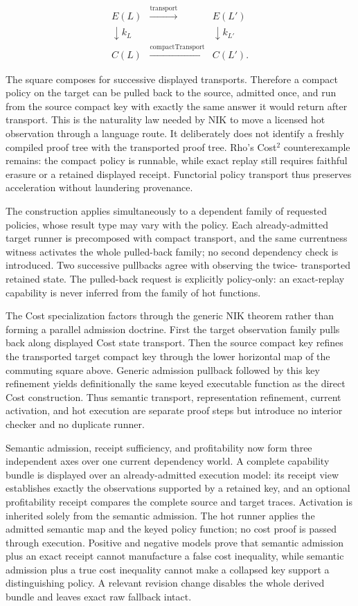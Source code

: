 \documentclass[11pt]{article}
\begin{document}
\[
\begin{array}{ccc}
  E(L) & \xrightarrow{\mathrm{transport}} & E(L') \\
  \downarrow k_L & & \downarrow k_{L'} \\
  C(L) & \xrightarrow{\mathrm{compactTransport}} & C(L').
\end{array}
\]

The square composes for successive displayed transports.  Therefore a compact
policy on the target can be pulled back to the source, admitted once, and run
from the source compact key with exactly the same answer it would return after
transport.  This is the naturality law needed by NIK to move a licensed hot
observation through a language route.  It deliberately does not identify a
freshly compiled proof tree with the transported proof tree.  Rho's Cost$^2$
counterexample remains: the compact policy is runnable, while exact replay
still requires faithful erasure or a retained displayed receipt.  Functorial
policy transport thus preserves acceleration without laundering provenance.

The construction applies simultaneously to a dependent family of requested
policies, whose result type may vary with the policy.  Each already-admitted
target runner is precomposed with compact transport, and the same currentness
witness activates the whole pulled-back family; no second dependency check is
introduced.  Two successive pullbacks agree with observing the twice-
transported retained state.  The pulled-back request is explicitly
policy-only: an exact-replay capability is never inferred from the family of
hot functions.

The Cost specialization factors through the generic NIK theorem rather than
forming a parallel admission doctrine.  First the target observation family
pulls back along displayed Cost state transport.  Then the source compact key
refines the transported target compact key through the lower horizontal map of
the commuting square above.  Generic admission pullback followed by this key
refinement yields definitionally the same keyed executable function as the
direct Cost construction.  Thus semantic transport, representation
refinement, current activation, and hot execution are separate proof steps but
introduce no interior checker and no duplicate runner.

Semantic admission, receipt sufficiency, and profitability now form three
independent axes over one current dependency world.  A complete capability
bundle is displayed over an already-admitted execution model: its receipt view
establishes exactly the observations supported by a retained key, and an
optional profitability receipt compares the complete source and target traces.
Activation is inherited solely from the semantic admission.  The hot runner
applies the admitted semantic map and the keyed policy function; no cost proof
is passed through execution.  Positive and negative models prove that semantic
admission plus an exact receipt cannot manufacture a false cost inequality,
while semantic admission plus a true cost inequality cannot make a collapsed
key support a distinguishing policy.  A relevant revision change disables the
whole derived bundle and leaves exact raw fallback intact.
\end{document}
